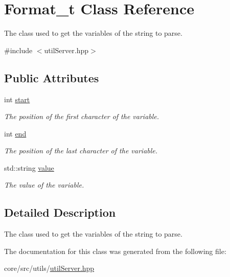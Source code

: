 \hypertarget{structFormat__t}{
\section{Format\_\-t Class Reference}
\label{structFormat__t}
}


The class used to get the variables of the string to parse.  




{\ttfamily \#include $<$utilServer.hpp$>$}

\subsection*{Public Attributes}
\begin{DoxyCompactItemize}
\item 
\hypertarget{structFormat__t_a1f2650b547e8e887adfa64fb66586221}{
int \hyperlink{structFormat__t_a1f2650b547e8e887adfa64fb66586221}{start}}
\label{structFormat__t_a1f2650b547e8e887adfa64fb66586221}

\begin{DoxyCompactList}\small\item\em The position of the first character of the variable. \item\end{DoxyCompactList}\item 
\hypertarget{structFormat__t_a1c612c68847a8987b5148f223b87ebca}{
int \hyperlink{structFormat__t_a1c612c68847a8987b5148f223b87ebca}{end}}
\label{structFormat__t_a1c612c68847a8987b5148f223b87ebca}

\begin{DoxyCompactList}\small\item\em The position of the last character of the variable. \item\end{DoxyCompactList}\item 
\hypertarget{structFormat__t_a9545825afdecf274b3b52d023e303bc0}{
std::string \hyperlink{structFormat__t_a9545825afdecf274b3b52d023e303bc0}{value}}
\label{structFormat__t_a9545825afdecf274b3b52d023e303bc0}

\begin{DoxyCompactList}\small\item\em The value of the variable. \item\end{DoxyCompactList}\end{DoxyCompactItemize}


\subsection{Detailed Description}
The class used to get the variables of the string to parse. 

The documentation for this class was generated from the following file:\begin{DoxyCompactItemize}
\item 
core/src/utils/\hyperlink{utilServer_8hpp}{utilServer.hpp}\end{DoxyCompactItemize}
